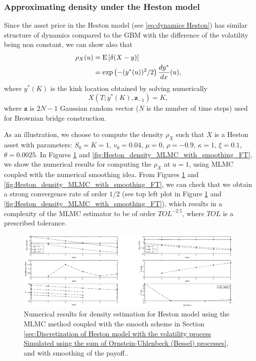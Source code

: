 \subsubsection{Approximating density under the Heston model}\label{sec:Approximating density under the Heston model}
Since the asset price in the  Heston model (see \eqref{eq:dynamics Heston})   has similar structure of dynamics compared to the GBM with the difference of the volatility being non constant, we can show also that 
\begin{align}
\rho_{X}(u)&=\mathrm{E}\left[\delta(X-y)\right]\nonumber\\
&=\exp\left(-(y^\ast(u))^2/2\right) \frac{d y^\ast}{dx}(u),
\end{align}
where $y^\ast(K)$ is the kink location obtained by solving numerically 
$$X(T; y^\ast(K), \mathbf{z}_{-1})=K,$$
where  $\mathbf{z}$ is $2N-1$ Gaussian random  vector ($N$ is the number of time steps) used for Brownian bridge construction.

As an illustration, we choose to compute the density $\rho_{X}$  such that $X$ is a Heston asset with parameters: $S_0=K=1$, $v_0=0.04$, $\mu=0$,  $\rho=-0.9$, $\kappa=1$, $\xi=0.1$, $\theta=0.0025$.  In Figures \ref{fig:Heston_density_MLMC_with_smoothing_OU} and \ref{fig:Heston_density_MLMC_with_smoothing_FT}, we show the numerical results  for computing the $\rho_{X}$ at $u=1$, using  MLMC coupled with the numerical smoothing idea. From Figures \ref{fig:Heston_density_MLMC_with_smoothing_OU} and \ref{fig:Heston_density_MLMC_with_smoothing_FT}, we can check that we obtain a strong convergence rate of order $1/2$ (see  top left plot in Figure \ref{fig:Heston_density_MLMC_with_smoothing_OU} and \ref{fig:Heston_density_MLMC_with_smoothing_FT}), which results in a complexity of the MLMC estimator to be of order $TOL^{-2.5}$, where $TOL$ is a prescribed tolerance.
\FloatBarrier
	\begin{figure}[h!]
\centering
\includegraphics[width=1.2\linewidth]{./figures/MLMC_density_Heston_estimation/OU/digital_option_set1_L_0_8_steps_L_5.eps}

\caption{Numerical results for  density estimation  for Heston model using the MLMC method coupled with  the smooth   scheme in Section \ref{sec:Discretization of Heston model with the volatility process Simulated using the sum of  Ornstein-Uhlenbeck (Bessel) processes}, and with smoothing of the payoff..}
\label{fig:Heston_density_MLMC_with_smoothing_OU}
\end{figure}

